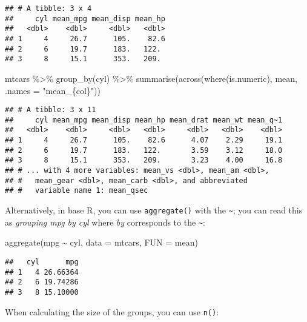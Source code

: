 \documentclass[
]{book}
\newenvironment{Shaded}{\begin{snugshade}}{\end{snugshade}}
\newcommand{\AttributeTok}[1]{\textcolor[rgb]{0.77,0.63,0.00}{#1}}
\newcommand{\FunctionTok}[1]{\textcolor[rgb]{0.00,0.00,0.00}{#1}}
\newcommand{\NormalTok}[1]{#1}
\newcommand{\SpecialCharTok}[1]{\textcolor[rgb]{0.00,0.00,0.00}{#1}}
\newcommand{\StringTok}[1]{\textcolor[rgb]{0.31,0.60,0.02}{#1}}
\begin{document}
\begin{verbatim}
## # A tibble: 3 x 4
##     cyl mean_mpg mean_disp mean_hp
##   <dbl>    <dbl>     <dbl>   <dbl>
## 1     4     26.7      105.    82.6
## 2     6     19.7      183.   122. 
## 3     8     15.1      353.   209.
\end{verbatim}

\begin{Shaded}
\begin{Highlighting}[]
\NormalTok{mtcars }\SpecialCharTok{\%\textgreater{}\%} \FunctionTok{group\_by}\NormalTok{(cyl) }\SpecialCharTok{\%\textgreater{}\%} 
  \FunctionTok{summarise}\NormalTok{(}\FunctionTok{across}\NormalTok{(}\FunctionTok{where}\NormalTok{(is.numeric), mean, }\AttributeTok{.names =} \StringTok{"mean\_\{col\}"}\NormalTok{))}
\end{Highlighting}
\end{Shaded}

\begin{verbatim}
## # A tibble: 3 x 11
##     cyl mean_mpg mean_disp mean_hp mean_drat mean_wt mean_q~1
##   <dbl>    <dbl>     <dbl>   <dbl>     <dbl>   <dbl>    <dbl>
## 1     4     26.7      105.    82.6      4.07    2.29     19.1
## 2     6     19.7      183.   122.       3.59    3.12     18.0
## 3     8     15.1      353.   209.       3.23    4.00     16.8
## # ... with 4 more variables: mean_vs <dbl>, mean_am <dbl>,
## #   mean_gear <dbl>, mean_carb <dbl>, and abbreviated
## #   variable name 1: mean_qsec
\end{verbatim}

Alternatively, in base R, you can use \texttt{aggregate()} with the \texttt{\textasciitilde{}}; you can read this as \emph{grouping mpg by cyl} where \emph{by} corresponds to the \texttt{\textasciitilde{}}:

\begin{Shaded}
\begin{Highlighting}[]
\FunctionTok{aggregate}\NormalTok{(mpg }\SpecialCharTok{\textasciitilde{}}\NormalTok{ cyl, }\AttributeTok{data =}\NormalTok{ mtcars, }\AttributeTok{FUN =}\NormalTok{ mean)}
\end{Highlighting}
\end{Shaded}

\begin{verbatim}
##   cyl      mpg
## 1   4 26.66364
## 2   6 19.74286
## 3   8 15.10000
\end{verbatim}

When calculating the size of the groups, you can use \texttt{n()}:
\end{document}
